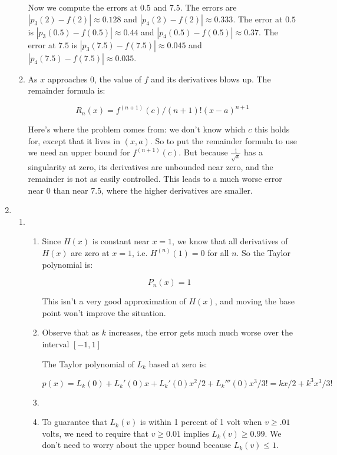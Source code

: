 \begin{enumerate}
\begin{enumerate}
                Now we compute the errors at $0.5$ and $7.5$. The errors are $|p_3(2)-f(2)| \approx 0.128$ and $|p_4(2)-f(2)| \approx 0.333$. The error at $0.5$ is $|p_3(0.5)-f(0.5)| \approx 0.44$ and $|p_4(0.5)-f(0.5)| \approx 0.37$. The error at $7.5$ is $|p_3(7.5)-f(7.5)| \approx 0.045$ and $|p_4(7.5)-f(7.5)| \approx 0.035$. 

		      \item As $x$ approaches $0$, the value of $f$ and its derivatives blows up. The remainder formula is:

		            \[R_n(x) = f^{(n+1)}(c)/(n+1)!(x-a)^{n+1}\]

                Here's where the problem comes from: we don't know which $c$ this holds for, except that it lives in $(x,a)$. So to put the remainder formula to use we need an upper bound for $f^{(n+1)}(c)$. But because $\frac{1}{\sqrt{x}}$ has a singularity at zero, its derivatives are unbounded near zero, and the remainder is not as easily controlled. This leads to a much worse error near $0$ than near $7.5$, where the higher derivatives are smaller. 






	      \end{enumerate}
	\item \begin{enumerate}
		      \item
		            \begin{enumerate}
			            \item Since $H(x)$ is constant near $x=1$, we know that all derivatives of $H(x)$ are zero at $x=1$, i.e. $H^{(n)}(1)=0$ for all $n$. So the Taylor polynomial is:

			                  \[P_n(x) = 1\]

			                  This isn't a very good approximation of $H(x)$, and moving the base point won't improve the situation.


			            \item Observe that as $k$ increases, the error gets much much worse over the interval $[-1,1]$

			                  The Taylor polynomial of $L_k$ based at zero is:

			                  \[p(x) = L_k(0) + L_k'(0)x +L_k'(0)x^2/2 + L_k'''(0)x^3/3! = kx/2 + k^3x^3/3!\]
			            \item

			            \item To guarantee that $L_k(v)$ is within 1 percent of 1 volt when $v \geq .01$ volts, we need to require that $v\geq 0.01 $ implies $L_k(v)\geq 0.99$. We don't need to worry about the upper bound because $L_k(v) \leq 1$.


\end{enumerate}
\end{enumerate}
\end{enumerate}
